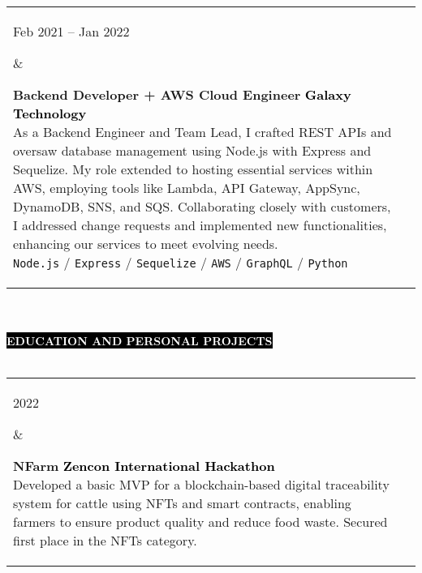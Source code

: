 \documentclass[10pt,A4]{article}
\makeatletter
\newcounter{a}
\newcounter{b}
\newcounter{c}
\newcommand{\cvsection}[1] {
	\textcolor{white}{\MakeUppercase{\textbf{#1}}}
}
\newcommand{\cvsect}[1]{
	\colorbox{black}{{\cvsection{#1}}}\\\\%
}
\newenvironment{entrylist}{%
	\begin{tabular*}{\textwidth}[t]{@{\extracolsep{\fill}}ll}
	}{%
	\end{tabular*}
}
\newcommand{\entry}[4]{%
	\parbox[t]{3.5cm}{%
		#1%
	}%
	&\parbox[t]{14cm}{%
		\textbf{#2}%
		\hfill%
		{\footnotesize \textbf{\textcolor{black}{#3}}}\\%
		#4%
	}\\\\}
\newcommand{\slashsep}{
	\hspace{2mm}/\hspace{2mm}
}
\makeatother
\begin{document}
\begin{entrylist}
		\entry
		{Feb 2021 – Jan 2022}
		{Backend Developer + AWS Cloud Engineer}
		{Galaxy Technology}
		{As a Backend Engineer and Team Lead, I crafted REST APIs and oversaw database
		management using Node.js with Express and Sequelize. My role extended to hosting
		essential services within AWS, employing tools like Lambda, API Gateway,
		AppSync, DynamoDB, SNS, and SQS. Collaborating closely with customers, I addressed
		change requests and implemented new functionalities, enhancing our services to
		meet evolving needs.\\
			\texttt{Node.js}\slashsep\texttt{Express}\slashsep\texttt{Sequelize}\slashsep\texttt{AWS}\slashsep\texttt{GraphQL}\slashsep\texttt{Python}}
	\end{entrylist}
	\\\\


	\cvsect{Education and Personal Projects}
	\begin{entrylist}
		\entry
		{2022}
		{NFarm}
		{Zencon International Hackathon}
		{Developed a basic MVP for a blockchain-based digital traceability system for cattle using NFTs
		and smart contracts, enabling farmers to ensure product quality and reduce food waste. Secured
		first place in the NFTs category.}
		\entry
		{2019}
		{Lung Cancer Detection System with AI - Damai}
		{Expo Science International}
		{Developed an MVP system using Convolutional Neural Networks and image processing to detect lung
		cancer in its early stages.Selected as one of the top 100 projects representing Mexico at Expo
		Science International in Abu Dhabi, UAE.}
		\entry
		{2017 – 2020}
		{Software Engineering}
		{Universidad Politécnica de Durango (UNIPOLI)}
		{Graduated with a 9.42 score.}
	\end{entrylist}%
	\\\\
	
\end{document}
